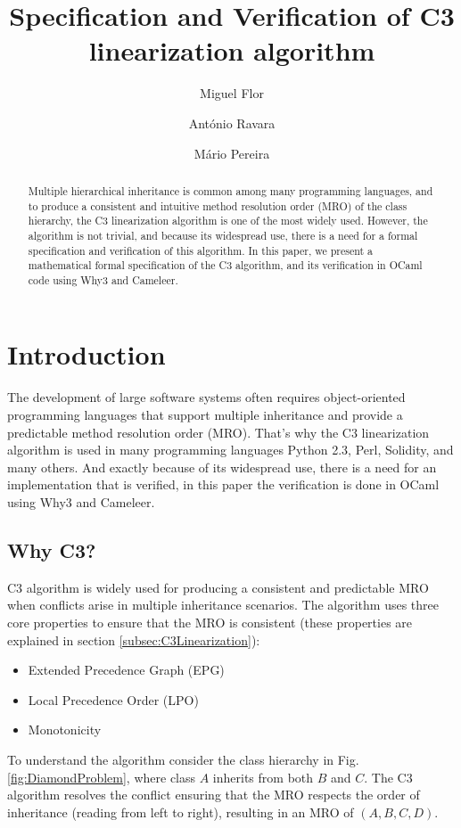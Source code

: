 \documentclass[runningheads]{llncs}
\title{Specification and Verification of C3 linearization algorithm}
\author{
  Miguel Flor\inst{1} \and António Ravara\inst{2} \and Mário Pereira\inst{2}
}
\institute{
  NOVA LINCS, Nova School of Science and Technology \\
  \email{m.flor@campus.fct.unl.pt}, \email{\{aravara, mjp.pereira\}@fct.unl.pt}
}
\begin{document}
\maketitle

\begin{abstract}
Multiple hierarchical inheritance is common among many programming languages, and
to produce a consistent and intuitive method resolution order (MRO) of the class hierarchy,
the C3 linearization algorithm is one of the most widely used.
However, the algorithm is not trivial, and because its widespread use,
there is a need for a formal specification and verification of this algorithm.
In this paper, we present a mathematical formal specification of the C3 algorithm,
 and its verification in OCaml code using Why3 and Cameleer.

     
\end{abstract}
\section{Introduction}
The development of large software systems often requires object-oriented programming languages that support multiple inheritance and provide a predictable method resolution order (MRO). 
 That's why the C3 linearization algorithm is used in many programming languages Python 2.3\autocite{Python23Method}, Perl\autocite{MroMethodResolution}, Solidity\autocite{LanguageInfluencesSolidity}, and many others.
 And exactly because of its widespread use, there is a need for an implementation that is verified, in this paper the verification is done in OCaml using Why3 and Cameleer.

\subsection{Why C3?}
C3 algorithm is widely used for producing a consistent and predictable MRO when conflicts arise in multiple inheritance scenarios.
The algorithm uses three core properties to ensure that the MRO is consistent (these properties are explained in section \ref{subsec:C3Linearization}):
\begin{itemize}
    \item Extended Precedence Graph (EPG)
    \item Local Precedence Order (LPO)
    \item Monotonicity
\end{itemize}
To understand the algorithm consider the class hierarchy in Fig. \ref{fig:DiamondProblem}, where class $A$ inherits from both $B$ and $C$. The C3 algorithm resolves the conflict ensuring that the MRO respects the order of inheritance (reading from left to right), resulting in an MRO of $(A, B, C, D)$.
\end{document}
